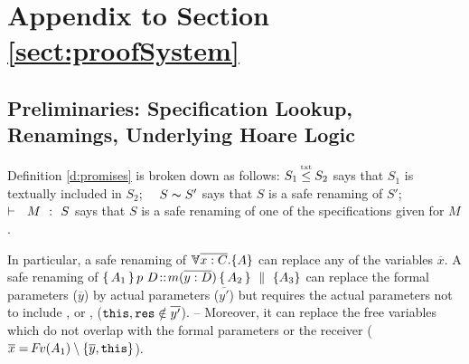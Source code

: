 \section{Appendix to Section \ref{sect:proofSystem} } \label{app:proof}
\label{app:hoare}


\subsection{Preliminaries: Specification Lookup,  Renamings, Underlying Hoare Logic}

Definition \ref{d:promises} is broken down as follows:  $S_1 \txtin  S_2$ says that $S_1$ is textually included in $S_2$; \ \ $S \thicksim S'$ says that $S$ is a safe renaming of $S'$; \ \   ${\vdash \ \ M\ \ \mathbf{:}\ \ S}$ says that $S$ is a safe renaming of one of the specifications given for $M$. 
 
In particular, a safe renaming of  ${ \TwoStatesN {\overline {x:C}} {A}  }$ can replace any of the variables $\overline x$.  
A safe renaming  of ${\mprepostN{A_1}{p\ D}{m}{y}{D}{A_2} {A_3}}$  can replace  the formal parameters ($\overline y$) by actual parameters  ($\overline {y'}$) but requires the actual parameters  not to include , or , (\ie $\mbox{\normalfont{\texttt{this}}}, \mbox{\normalfont{\texttt{res}}}\notin \overline{y'}$). -- %
Moreover, it can replace  the free variables which do not overlap with the formal parameters or the receiver ( $\overline{x}={\hspace{-1pt}F\hspace{-1pt}}v(A_1)\setminus\{{\overline y},\mbox{\normalfont{\texttt{this}}}\}$).

